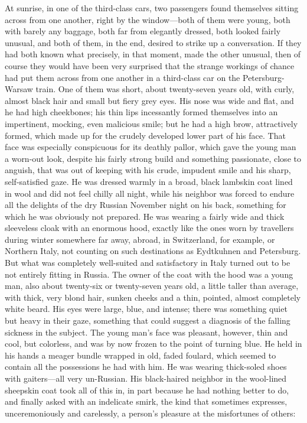 At sunrise, in one of the third-class cars, two passengers found themselves sitting across from one another, right by the window---both of them were young, both with barely any baggage, both far from elegantly dressed, both looked fairly unusual, and both of them, in the end, desired to strike up a conversation. If they had both known what precisely, in that moment, made the other unusual, then of course they would have been very surprised that the strange workings of chance had put them across from one another in a third-class car on the Petersburg-Warsaw train. One of them was short, about twenty-seven years old, with curly, almost black hair and small but fiery grey eyes. His nose was wide and flat, and he had high cheekbones; his thin lips incessantly formed themselves into an impertinent, mocking, even malicious smile; but he had a high brow, attractively formed, which made up for the crudely developed lower part of his face. That face was especially conspicuous for its deathly pallor, which gave the young man a worn-out look, despite his fairly strong build and something passionate, close to anguish, that was out of keeping with his crude, impudent smile and his sharp, self-satisfied gaze. He was dressed warmly in a broad, black lambskin coat lined in wool and did not feel chilly all night, while his neighbor was forced to endure all the delights of the dry Russian November night on his back, something for which he was obviously not prepared. He was wearing a fairly wide and thick sleeveless cloak with an enormous hood, exactly like the ones worn by travellers during winter somewhere far away, abroad, in Switzerland, for example, or Northern Italy, not counting on such destinations as Eydtkuhnen and Petersburg. But what was completely well-suited and satisfactory in Italy turned out to be not entirely fitting in Russia. The owner of the coat with the hood was a young man, also about twenty-six or twenty-seven years old, a little taller than average, with thick, very blond hair, sunken cheeks and a thin, pointed, almost completely white beard. His eyes were large, blue, and intense; there was something quiet but heavy in their gaze, something that could suggest a diagnosis of the falling sickness in the subject. The young man's face was pleasant, however, thin and cool, but colorless, and was by now frozen to the point of turning blue. He held in his hands a meager bundle wrapped in old, faded foulard, which seemed to contain all the possessions he had with him. He was wearing thick-soled shoes with gaiters---all very un-Russian. His black-haired neighbor in the wool-lined sheepskin coat took all of this in, in part because he had nothing better to do, and finally asked with an indelicate smirk, the kind that sometimes expresses, unceremoniously and carelessly, a person's pleasure at the misfortunes of others:

